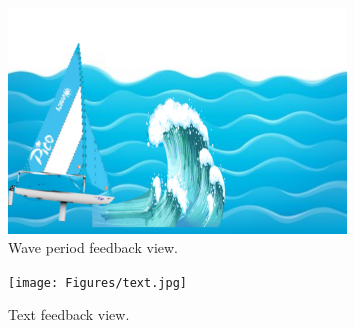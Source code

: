 \begin{figure}[H]
	\centering
	\includegraphics[width=0.8\textwidth]{Figures/wave.png}
	\caption{Wave period feedback view.}
	\label{feedback-wave}
\end{figure}
\begin{figure}[H]
	\centering
	\texttt{[image: Figures/text.jpg]}
	\caption{Text feedback view.}
	\label{feedback-text}
\end{figure}